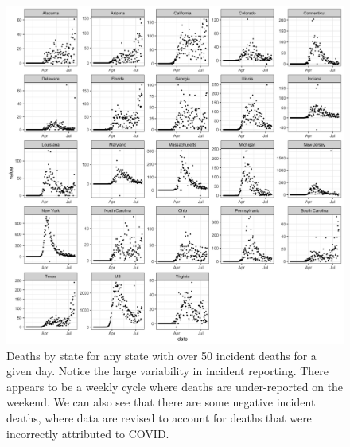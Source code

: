 \documentclass[11pt]{amsart}
\begin{document}
 \begin{figure}
     \centering
     \includegraphics[scale=.175]{data_plot.png}
     \caption{Deaths by state for any state with over 50 incident deaths for a given day. Notice the large variability in incident reporting. There appears to be a weekly cycle where deaths are under-reported on the weekend. We can also see that there are some negative incident deaths, where data are revised to account for deaths that were incorrectly attributed to COVID. }
     \label{fig:data}
 \end{figure}
 
\end{document}
